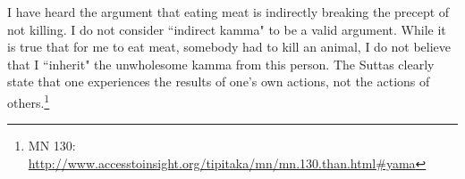 I have heard the argument that eating meat is indirectly breaking the precept of not killing. I do not consider ``indirect kamma" to be a valid argument. While it is true that for me to eat meat, somebody had to kill an animal, I do not believe that I ``inherit" the unwholesome kamma from this person. The Suttas clearly state that one experiences the results of one's own actions, not the actions of others.\footnote{MN 130: \url{http://www.accesstoinsight.org/tipitaka/mn/mn.130.than.html\#yama}}

